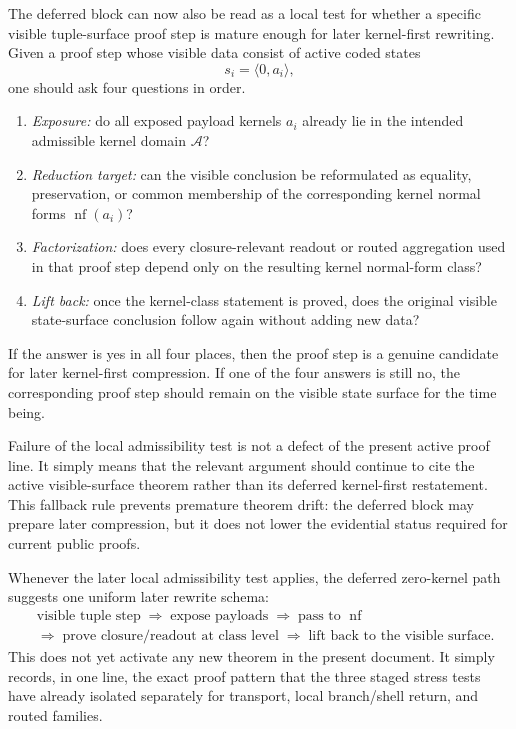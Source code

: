 \begin{remark}\label{rem:qam-zero-kernel-local-test}
The deferred block can now also be read as a local test for whether a specific visible tuple-surface proof step is mature enough for later kernel-first rewriting. Given a proof step whose visible data consist of active coded states
\[
s_i=\langle 0,a_i\rangle,
\]
one should ask four questions in order.
\begin{enumerate}
\item \emph{Exposure:} do all exposed payload kernels $a_i$ already lie in the intended admissible kernel domain $\mathcal A$?
\item \emph{Reduction target:} can the visible conclusion be reformulated as equality, preservation, or common membership of the corresponding kernel normal forms $\operatorname{nf}(a_i)$?
\item \emph{Factorization:} does every closure-relevant readout or routed aggregation used in that proof step depend only on the resulting kernel normal-form class?
\item \emph{Lift back:} once the kernel-class statement is proved, does the original visible state-surface conclusion follow again without adding new data?
\end{enumerate}
If the answer is yes in all four places, then the proof step is a genuine candidate for later kernel-first compression. If one of the four answers is still no, the corresponding proof step should remain on the visible state surface for the time being.
\end{remark}

\begin{remark}\label{rem:qam-zero-kernel-fallback}
Failure of the local admissibility test is not a defect of the present active proof line. It simply means that the relevant argument should continue to cite the active visible-surface theorem rather than its deferred kernel-first restatement. This fallback rule prevents premature theorem drift: the deferred block may prepare later compression, but it does not lower the evidential status required for current public proofs.
\end{remark}

\begin{remark}\label{rem:qam-zero-kernel-rewrite-schema}
Whenever the later local admissibility test applies, the deferred zero-kernel path suggests one uniform later rewrite schema:
\[
\begin{aligned}
&\text{visible tuple step}
\;\Longrightarrow\;
\text{expose payloads}
\;\Longrightarrow\;
\text{pass to }\operatorname{nf}
\\[0.2em]
&\Longrightarrow\;
\text{prove closure/readout at class level}
\;\Longrightarrow\;
\text{lift back to the visible surface}.
\end{aligned}
\]
This does not yet activate any new theorem in the present document. It simply records, in one line, the exact proof pattern that the three staged stress tests have already isolated separately for transport, local branch/shell return, and routed families.
\end{remark}

